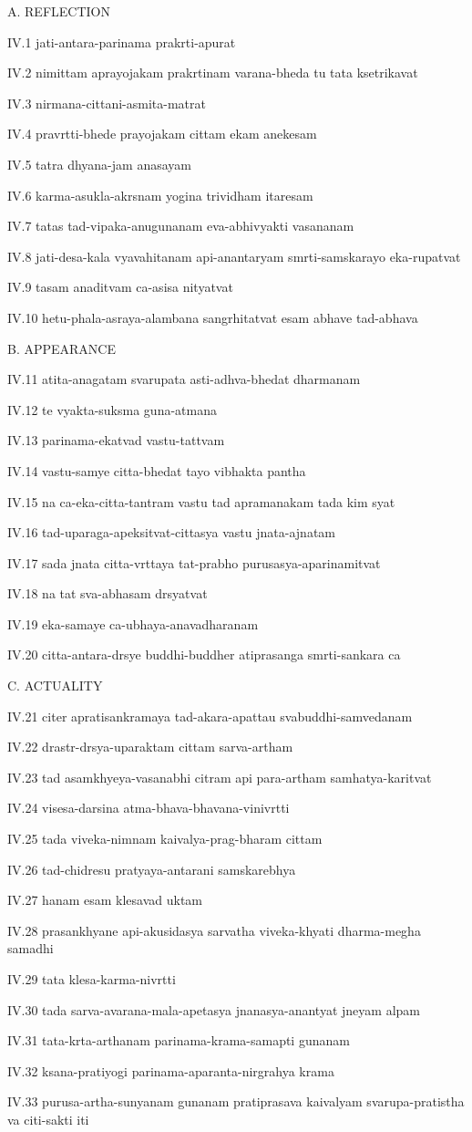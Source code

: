 A. REFLECTION

IV.1
jati-antara-parinama prakrti-apurat

IV.2
nimittam aprayojakam prakrtinam varana-bheda tu tata ksetrikavat

IV.3
nirmana-cittani-asmita-matrat

IV.4
pravrtti-bhede prayojakam cittam ekam anekesam

IV.5
tatra dhyana-jam anasayam

IV.6
karma-asukla-akrsnam yogina trividham itaresam

IV.7
tatas tad-vipaka-anugunanam eva-abhivyakti vasananam

IV.8
jati-desa-kala vyavahitanam api-anantaryam smrti-samskarayo eka-rupatvat

IV.9
tasam anaditvam ca-asisa nityatvat

IV.10
hetu-phala-asraya-alambana sangrhitatvat esam abhave tad-abhava

B. APPEARANCE

IV.11
atita-anagatam svarupata asti-adhva-bhedat dharmanam

IV.12
te vyakta-suksma guna-atmana

IV.13
parinama-ekatvad vastu-tattvam

IV.14
vastu-samye citta-bhedat tayo vibhakta pantha

IV.15
na ca-eka-citta-tantram vastu tad apramanakam tada kim syat

IV.16
tad-uparaga-apeksitvat-cittasya vastu jnata-ajnatam

IV.17
sada jnata citta-vrttaya tat-prabho purusasya-aparinamitvat

IV.18
na tat sva-abhasam drsyatvat

IV.19
eka-samaye ca-ubhaya-anavadharanam

IV.20
citta-antara-drsye buddhi-buddher atiprasanga smrti-sankara ca

C. ACTUALITY

IV.21
citer apratisankramaya tad-akara-apattau svabuddhi-samvedanam

IV.22
drastr-drsya-uparaktam cittam sarva-artham

IV.23
tad asamkhyeya-vasanabhi citram api para-artham samhatya-karitvat

IV.24
visesa-darsina atma-bhava-bhavana-vinivrtti

IV.25
tada viveka-nimnam kaivalya-prag-bharam cittam

IV.26
tad-chidresu pratyaya-antarani samskarebhya

IV.27
hanam esam klesavad uktam

IV.28
prasankhyane api-akusidasya sarvatha viveka-khyati dharma-megha samadhi

IV.29
tata klesa-karma-nivrtti

IV.30
tada sarva-avarana-mala-apetasya jnanasya-anantyat jneyam alpam

IV.31
tata-krta-arthanam parinama-krama-samapti gunanam

IV.32
ksana-pratiyogi parinama-aparanta-nirgrahya krama

IV.33
purusa-artha-sunyanam gunanam pratiprasava kaivalyam
svarupa-pratistha va citi-sakti iti
